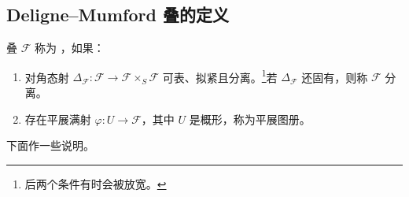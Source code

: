 \subsection{Deligne–Mumford 叠的定义}
\begin{definition}\label{def:2.9}
叠 $\mathcal F$ 称为 ，如果：
\begin{enumerate}
\item 对角态射 $\Delta_{\mathcal F}:\mathcal F\to\mathcal F\times_S\mathcal F$ 可表、拟紧且分离。\footnote{后两个条件有时会被放宽。}若 $\Delta_{\mathcal F}$ 还固有，则称 $\mathcal F$ 分离。
\item 存在平展满射 $\varphi:U\to\mathcal F$，其中 $U$ 是概形，称为平展图册。
\end{enumerate}
\end{definition}
下面作一些说明。
